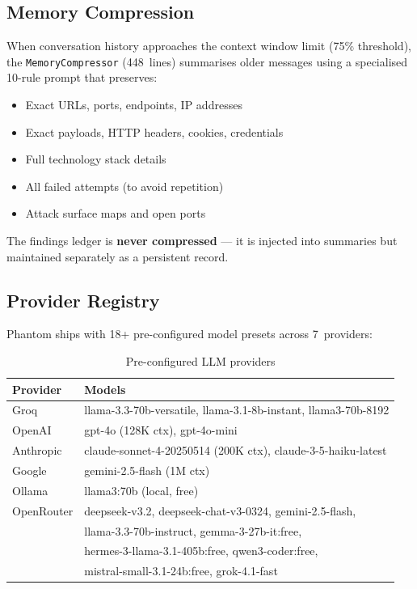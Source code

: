\documentclass[11pt,a4paper]{article}
\begin{document}
\subsection{Memory Compression}
When conversation history approaches the context window limit (75\% threshold),
the \texttt{MemoryCompressor} (448~lines) summarises older messages using a
specialised 10-rule prompt that preserves:
\begin{itemize}[noitemsep]
  \item Exact URLs, ports, endpoints, IP addresses
  \item Exact payloads, HTTP headers, cookies, credentials
  \item Full technology stack details
  \item All failed attempts (to avoid repetition)
  \item Attack surface maps and open ports
\end{itemize}

The findings ledger is \textbf{never compressed} --- it is injected into summaries
but maintained separately as a persistent record.

\subsection{Provider Registry}
Phantom ships with 18+ pre-configured model presets across 7~providers:

\begin{table}[H]
\centering
\caption{Pre-configured LLM providers}
\label{tab:providers}
\begin{tabularx}{\textwidth}{lX}
\toprule
\textbf{Provider} & \textbf{Models} \\
\midrule
Groq       & llama-3.3-70b-versatile, llama-3.1-8b-instant, llama3-70b-8192 \\
OpenAI     & gpt-4o (128K ctx), gpt-4o-mini \\
Anthropic  & claude-sonnet-4-20250514 (200K ctx), claude-3-5-haiku-latest \\
Google     & gemini-2.5-flash (1M ctx) \\
Ollama     & llama3:70b (local, free) \\
OpenRouter & deepseek-v3.2, deepseek-chat-v3-0324, gemini-2.5-flash, \\
           & llama-3.3-70b-instruct, gemma-3-27b-it:free, \\
           & hermes-3-llama-3.1-405b:free, qwen3-coder:free, \\
           & mistral-small-3.1-24b:free, grok-4.1-fast \\
\bottomrule
\end{tabularx}
\end{table}
\end{document}

